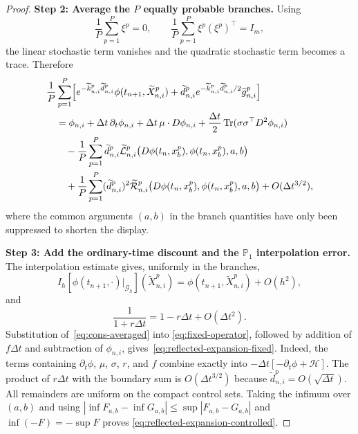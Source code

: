 \documentclass[11pt]{article}
\theoremstyle{definition}
\theoremstyle{remark}
\newcommand{\cG}{\mathcal{G}}
\newcommand{\Tr}{\operatorname{Tr}}
\begin{document}
\begin{proof}
		\medskip
		\noindent\textbf{Step 2: Average the $P$ equally probable branches.}
		Using
		\[
		\frac1P\sum_{p=1}^P\xi^p=0,
		\qquad
		\frac1P\sum_{p=1}^P\xi^p(\xi^p)^\top=I_m,
		\]
		the linear stochastic term vanishes and the quadratic stochastic term
		becomes a trace.  Therefore
		\begin{align}
			&\frac1P\sum_{p=1}^P\Bigl[
			e^{-\widetilde k_{n,i}^p\widetilde d_{n,i}^p}
			\phi(t_{n+1},\widetilde X_{n,i}^p)
			+\widetilde d_{n,i}^p
			e^{-\widetilde k_{n,i}^p\widetilde d_{n,i}^p/2}
			\widetilde g_{n,i}^p\Bigr]
			\notag\\
			&\quad=\phi_{n,i}+\Delta t\,\partial_t\phi_{n,i}
			+\Delta t\,\mu\cdot D\phi_{n,i}
			+\frac{\Delta t}{2}\Tr(\sigma\sigma^\top D^2\phi_{n,i})
			\notag\\
			&\qquad-\frac1P\sum_{p=1}^P\widetilde d_{n,i}^p
			\widetilde{\mathcal L}_{n,i}^p
			\bigl(D\phi(t_n,x_b^p),\phi(t_n,x_b^p),a,b\bigr)
			\notag\\
			&\qquad+\frac1P\sum_{p=1}^P(\widetilde d_{n,i}^p)^2
			\widetilde{\mathcal R}_{n,i}^p
			\bigl(D\phi(t_n,x_b^p),\phi(t_n,x_b^p),a,b\bigr)
			+O(\Delta t^{3/2}),
			\label{eq:cons-averaged}
		\end{align}
		where the common arguments $(a,b)$ in the branch quantities have only been
		suppressed to shorten the display.
		
		\medskip
		\noindent\textbf{Step 3: Add the ordinary-time discount and the
			$\mathbb P_1$ interpolation error.}
		The interpolation estimate gives, uniformly in the branches,
		\[
		I_h[\phi(t_{n+1},\cdot)|_{\cG_h}](\widetilde X_{n,i}^p)
		=\phi(t_{n+1},\widetilde X_{n,i}^p)+O(h^2),
		\]
		and
		\[
		\frac1{1+r\Delta t}=1-r\Delta t+O(\Delta t^2).
		\]
		Substitution of~\eqref{eq:cons-averaged} into
		\eqref{eq:fixed-operator}, followed by addition of $f\Delta t$ and
		subtraction of $\phi_{n,i}$, gives~\eqref{eq:reflected-expansion-fixed}.
		Indeed, the terms containing $\partial_t\phi$, $\mu$, $\sigma$, $r$, and
		$f$ combine exactly into $-\Delta t[-\partial_t\phi+\mathcal H]$.
		The product of $r\Delta t$ with the boundary sum is
		$O(\Delta t^{3/2})$ because
		$\widetilde d_{n,i}^p=O(\sqrt{\Delta t})$.
		All remainders are uniform on the compact control sets.  Taking the infimum
		over $(a,b)$ and using
		\(
		|\inf F_{a,b}-\inf G_{a,b}|\le\sup|F_{a,b}-G_{a,b}|
		\)
		and $\inf(-F)=-\sup F$ proves
		\eqref{eq:reflected-expansion-controlled}.
		

\end{proof}
\end{document}
